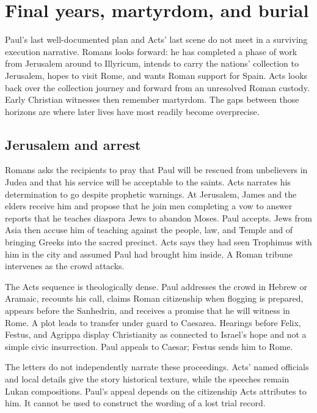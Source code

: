 \section{Final years, martyrdom, and burial}\label{sec:paul-death}

Paul's last well-documented plan and Acts' last scene do not meet in a surviving
execution narrative. Romans looks forward: he has completed a phase of work
from Jerusalem around to Illyricum, intends to carry the nations' collection
to Jerusalem, hopes to visit Rome, and wants Roman support for Spain. Acts
looks back over the collection journey and forward from an unresolved Roman
custody. Early Christian witnesses then remember martyrdom. The gaps between
those horizons are where later lives have most readily become overprecise.

\subsection{Jerusalem and arrest}

Romans asks the recipients to pray that Paul will be rescued from unbelievers
in Judea and that his service will be acceptable to the saints. Acts narrates
his determination to go despite prophetic warnings. At Jerusalem, James and
the elders receive him and propose that he join men completing a vow to answer
reports that he teaches diaspora Jews to abandon Moses. Paul accepts. Jews
from Asia then accuse him of teaching against the people, law, and Temple and
of bringing Greeks into the sacred precinct. Acts says they had seen Trophimus
with him in the city and assumed Paul had brought him inside. A Roman tribune
intervenes as the crowd attacks.

The Acts sequence is theologically dense. Paul addresses the crowd in Hebrew
or Aramaic, recounts his call, claims Roman citizenship when flogging is
prepared, appears before the Sanhedrin, and receives a promise that he will
witness in Rome. A plot leads to transfer under guard to Caesarea. Hearings
before Felix, Festus, and Agrippa display Christianity as connected to Israel's
hope and not a simple civic insurrection. Paul appeals to Caesar; Festus sends
him to Rome.

The letters do not independently narrate these proceedings. Acts' named
officials and local details give the story historical texture, while the
speeches remain Lukan compositions. Paul's appeal depends on the citizenship
Acts attributes to him. It cannot be used to construct the wording of a lost
trial record.


